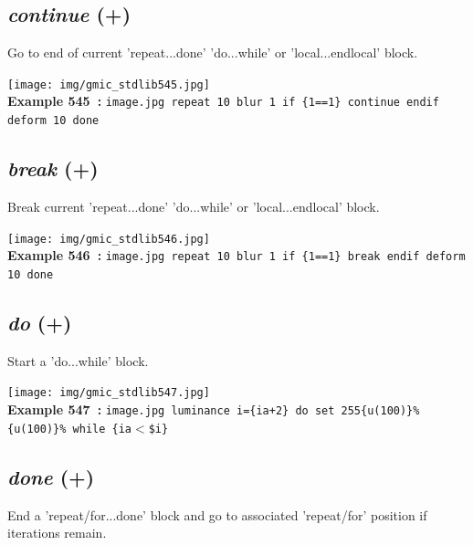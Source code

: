 \documentclass[a4paper,10.5pt,twoside]{book}
\def\comma{\discretionary{,}{}{,}}
\begin{document}
\subsection{\emph{continue} (+)}\vspace*{-0.7em}
Go to end of current 'repeat...done'{\comma} 'do...while' or 'local...endlocal' block.
\begin{center}\texttt{[image: img/gmic\_stdlib545.jpg]}\\
{\footnotesize \textbf{Example 545~:} \texttt{image.jpg repeat 10 blur 1 if \{1==1\} continue endif deform 10 done}}
\end{center}

\subsection{\emph{break} (+)}\vspace*{-0.7em}
Break current 'repeat...done'{\comma} 'do...while' or 'local...endlocal' block.
\begin{center}\texttt{[image: img/gmic\_stdlib546.jpg]}\\
{\footnotesize \textbf{Example 546~:} \texttt{image.jpg repeat 10 blur 1 if \{1==1\} break endif deform 10 done}}
\end{center}

\subsection{\emph{do} (+)}\vspace*{-0.7em}
Start a 'do...while' block.
\begin{center}\texttt{[image: img/gmic\_stdlib547.jpg]}\\
{\footnotesize \textbf{Example 547~:} \texttt{image.jpg luminance i=\{ia+2\} do set 255{\comma}\{u(100)\}\%{\comma}\{u(100)\}\% while \{ia$<$\$i\}}}
\end{center}

\subsection{\emph{done} (+)}\vspace*{-0.7em}
End a 'repeat/for...done' block{\comma} and go to associated 'repeat/for' position{\comma} if iterations remain.
\end{document}
